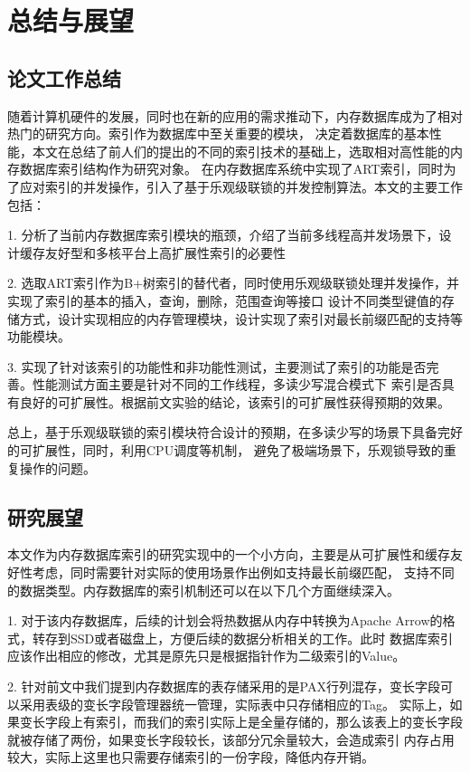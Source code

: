 
\chapter{总结与展望}

\section{论文工作总结}
随着计算机硬件的发展，同时也在新的应用的需求推动下，内存数据库成为了相对热门的研究方向。索引作为数据库中至关重要的模块，
决定着数据库的基本性能，本文在总结了前人们的提出的不同的索引技术的基础上，选取相对高性能的内存数据库索引结构作为研究对象。
在内存数据库系统中实现了ART索引，同时为了应对索引的并发操作，引入了基于乐观级联锁的并发控制算法。本文的主要工作包括：

1. 分析了当前内存数据库索引模块的瓶颈，介绍了当前多线程高并发场景下，设计缓存友好型和多核平台上高扩展性索引的必要性

2. 选取ART索引作为B+树索引的替代者，同时使用乐观级联锁处理并发操作，并实现了索引的基本的插入，查询，删除，范围查询等接口
设计不同类型键值的存储方式，设计实现相应的内存管理模块，设计实现了索引对最长前缀匹配的支持等功能模块。

3. 实现了针对该索引的功能性和非功能性测试，主要测试了索引的功能是否完善。性能测试方面主要是针对不同的工作线程，多读少写混合模式下
索引是否具有良好的可扩展性。根据前文实验的结论，该索引的可扩展性获得预期的效果。

总上，基于乐观级联锁的索引模块符合设计的预期，在多读少写的场景下具备完好的可扩展性，同时，利用CPU调度等机制，
避免了极端场景下，乐观锁导致的重复操作的问题。
\section{研究展望}

本文作为内存数据库索引的研究实现中的一个小方向，主要是从可扩展性和缓存友好性考虑，同时需要针对实际的使用场景作出例如支持最长前缀匹配，
支持不同的数据类型。内存数据库的索引机制还可以在以下几个方面继续深入。

1. 对于该内存数据库，后续的计划会将热数据从内存中转换为Apache Arrow的格式，转存到SSD或者磁盘上，方便后续的数据分析相关的工作。此时
数据库索引应该作出相应的修改，尤其是原先只是根据指针作为二级索引的Value。

2. 针对前文中我们提到内存数据库的表存储采用的是PAX行列混存，变长字段可以采用表级的变长字段管理器统一管理，实际表中只存储相应的Tag。
实际上，如果变长字段上有索引，而我们的索引实际上是全量存储的，那么该表上的变长字段就被存储了两份，如果变长字段较长，该部分冗余量较大，会造成索引
内存占用较大，实际上这里也只需要存储索引的一份字段，降低内存开销。


